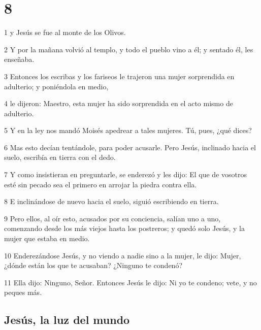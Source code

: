 \chapter{8}

\par 1 y Jesús se fue al monte de los Olivos.
\par 2 Y por la mañana volvió al templo, y todo el pueblo vino a él; y sentado él, les enseñaba.
\par 3 Entonces los escribas y los fariseos le trajeron una mujer sorprendida en adulterio; y poniéndola en medio,
\par 4 le dijeron: Maestro, esta mujer ha sido sorprendida en el acto mismo de adulterio.
\par 5 Y en la ley nos mandó Moisés apedrear a tales mujeres. Tú, pues, ¿qué dices?
\par 6 Mas esto decían tentándole, para poder acusarle. Pero Jesús, inclinado hacia el suelo, escribía en tierra con el dedo.
\par 7 Y como insistieran en preguntarle, se enderezó y les dijo: El que de vosotros esté sin pecado sea el primero en arrojar la piedra contra ella.
\par 8 E inclinándose de nuevo hacia el suelo, siguió escribiendo en tierra.
\par 9 Pero ellos, al oír esto, acusados por su conciencia, salían uno a uno, comenzando desde los más viejos hasta los postreros; y quedó solo Jesús, y la mujer que estaba en medio.
\par 10 Enderezándose Jesús, y no viendo a nadie sino a la mujer, le dijo: Mujer, ¿dónde están los que te acusaban? ¿Ninguno te condenó?
\par 11 Ella dijo: Ninguno, Señor. Entonces Jesús le dijo: Ni yo te condeno; vete, y no peques más.

\section*{Jesús, la luz del mundo}

